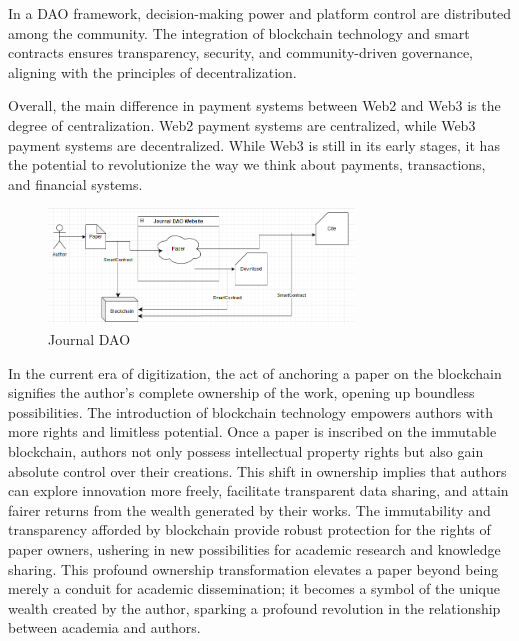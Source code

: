 \documentclass[lettersize,journal]{IEEEtran}
\begin{document}
In a DAO framework, decision-making power and platform control are distributed among the community. The integration of blockchain technology and smart contracts ensures transparency, security, and community-driven governance, aligning with the principles of decentralization.


Overall, the main difference in payment systems between Web2 and Web3 is the degree of centralization. Web2 payment systems are centralized, while Web3 payment systems are decentralized. While Web3 is still in its early stages, it has the potential to revolutionize the way we think about payments, transactions, and financial systems.


\begin{figure}[h]
  \centering
  \includegraphics[width=3.2in]{assets/jdao.png}
  \caption{Journal DAO}
\end{figure}

In the current era of digitization, the act of anchoring a paper on the blockchain signifies the author's complete ownership of the work, opening up boundless possibilities. The introduction of blockchain technology empowers authors with more rights and limitless potential. Once a paper is inscribed on the immutable blockchain, authors not only possess intellectual property rights but also gain absolute control over their creations. This shift in ownership implies that authors can explore innovation more freely, facilitate transparent data sharing, and attain fairer returns from the wealth generated by their works. The immutability and transparency afforded by blockchain provide robust protection for the rights of paper owners, ushering in new possibilities for academic research and knowledge sharing. This profound ownership transformation elevates a paper beyond being merely a conduit for academic dissemination; it becomes a symbol of the unique wealth created by the author, sparking a profound revolution in the relationship between academia and authors.
\end{document}
